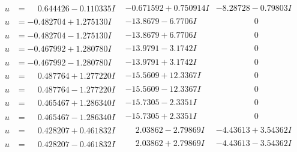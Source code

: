 \documentclass[1p]{elsarticle_modified}
\theoremstyle{definition}
\begin{document}
$$\begin{array}{c|c|c}
\begin{aligned}
u &= \phantom{-}0.644426 - 0.110335 I\end{aligned}
 & -0.671592 + 0.750914 I & -8.28728 - 0.79803 I \\ \hline\begin{aligned}
u &= -0.482704 + 1.275130 I\end{aligned}
 & -13.8679 - 6.7706 I & \phantom{-0.000000 } 0 \\ \hline\begin{aligned}
u &= -0.482704 - 1.275130 I\end{aligned}
 & -13.8679 + 6.7706 I & \phantom{-0.000000 } 0 \\ \hline\begin{aligned}
u &= -0.467992 + 1.280780 I\end{aligned}
 & -13.9791 - 3.1742 I & \phantom{-0.000000 } 0 \\ \hline\begin{aligned}
u &= -0.467992 - 1.280780 I\end{aligned}
 & -13.9791 + 3.1742 I & \phantom{-0.000000 } 0 \\ \hline\begin{aligned}
u &= \phantom{-}0.487764 + 1.277220 I\end{aligned}
 & -15.5609 + 12.3367 I & \phantom{-0.000000 } 0 \\ \hline\begin{aligned}
u &= \phantom{-}0.487764 - 1.277220 I\end{aligned}
 & -15.5609 - 12.3367 I & \phantom{-0.000000 } 0 \\ \hline\begin{aligned}
u &= \phantom{-}0.465467 + 1.286340 I\end{aligned}
 & -15.7305 - 2.3351 I & \phantom{-0.000000 } 0 \\ \hline\begin{aligned}
u &= \phantom{-}0.465467 - 1.286340 I\end{aligned}
 & -15.7305 + 2.3351 I & \phantom{-0.000000 } 0 \\ \hline\begin{aligned}
u &= \phantom{-}0.428207 + 0.461832 I\end{aligned}
 & \phantom{-}2.03862 - 2.79869 I & -4.43613 + 3.54362 I \\ \hline\begin{aligned}
u &= \phantom{-}0.428207 - 0.461832 I\end{aligned}
 & \phantom{-}2.03862 + 2.79869 I & -4.43613 - 3.54362 I \\ \hline\begin{aligned}

\end{aligned}
\end{array}$$
\end{document}
